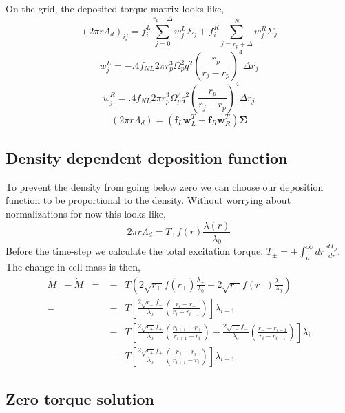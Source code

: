 \documentclass{article}
\begin{document}
On the grid, the deposited torque matrix looks like,
\begin{equation}
(2 \pi r \Lambda_d)_{ij} = f_i^L \sum_{j=0}^{r_p-\Delta } w_j^L \Sigma_j + f_i^R \sum_{j=r_p+\Delta}^N w_j^R \Sigma_j
\end{equation}
\begin{equation}
w_j^L = -.4 f_{NL} 2 \pi r_p^3 \Omega_p^2 q^2  \left( \frac{r_p}{r_j - r_p} \right)^4 \Delta r_j
\end{equation}
\begin{equation}
w_j^R=  .4 f_{NL} 2 \pi r_p^3 \Omega_p^2 q^2  \left( \frac{r_p}{r_j - r_p} \right)^4 \Delta r_j
\end{equation}
\begin{equation}
(2 \pi r \Lambda_d) = (\mathbf{f}_L \mathbf{w}_L^T + \mathbf{f}_R \mathbf{w}_R^T ) \mathbf{\Sigma}
\end{equation}

\subsection{Density dependent deposition function}
To prevent the density from going below zero we can choose our deposition function to be proportional to the density. Without worrying about normalizations for now this looks like,
\begin{equation}
2 \pi r \Lambda_d = T_\pm f(r) \frac{\lambda(r)}{\lambda_0}
\end{equation}
Before the time-step we calculate the total excitation torque, $T_\pm = \pm \int_a^\infty dr \, \frac{d T_p}{d r} $. The change in cell mass is then,
\begin{eqnarray}
\dot{M}_+ - \dot{M}_- = &-&T \left( 2 \sqrt{r_+} f(r_+) \frac{\lambda_+}{\lambda_0} - 2 \sqrt{r_-} f(r_-) \frac{\lambda_-}{\lambda_0} \right) \\
= &-& T \left[ \frac{2 \sqrt{r_-} f_-}{\lambda_0} \left( \frac{r_i-r_-}{r_i-r_{i-1}} \right) \right] \lambda_{i-1} \\
&-&T \left[ \frac{2 \sqrt{r_+} f_+}{\lambda_0} \left( \frac{r_{i+1}-r_+}{r_{i+1}-r_i} \right) - \frac{2 \sqrt{r_-} f_-}{\lambda_0} \left( \frac{r_{-}-r_{i-1}}{r_i-r_{i-1}} \right) \right] \lambda_i \\
&-&T \left[ \frac{2 \sqrt{r_+} f_+}{\lambda_0} \left( \frac{r_+-r_i}{r_{i+1}-r_i} \right) \right] \lambda_{i+1} 
\end{eqnarray}

 


\subsection{Zero torque solution}
\end{document}
